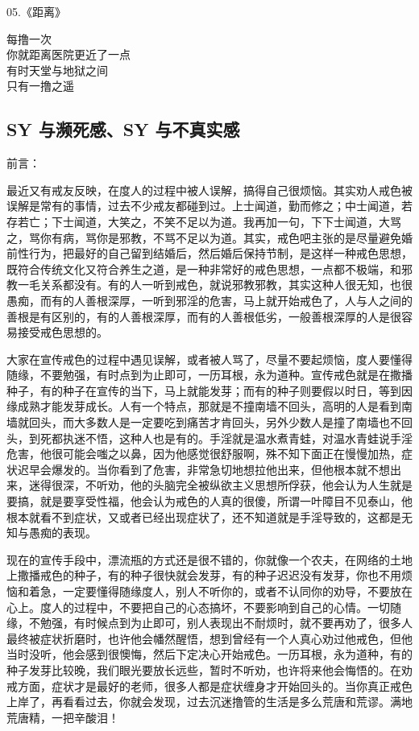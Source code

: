 \documentclass{ctexart}
\begin{document}
\begin{multicols}{2}
    \begin{center}
        05.《距离》\it

        每撸一次 \\ 你就距离医院更近了一点 \\ 有时天堂与地狱之间 \\ 只有一撸之遥
    \end{center}
\end{multicols}

\subsection{SY 与濒死感、SY 与不真实感}

前言：

最近又有戒友反映，在度人的过程中被人误解，搞得自己很烦恼。其实劝人戒色被误解是常有的事情，过去不少戒友都碰到过。上士闻道，勤而修之；中士闻道，若存若亡；下士闻道，大笑之，不笑不足以为道。我再加一句，下下士闻道，大骂之，骂你有病，骂你是邪教，不骂不足以为道。其实，戒色吧主张的是尽量避免婚前性行为，把最好的自己留到结婚后，然后婚后保持节制，是这样一种戒色思想，既符合传统文化又符合养生之道，是一种非常好的戒色思想，一点都不极端，和邪教一毛关系都没有。有的人一听到戒色，就说邪教邪教，其实这种人很无知，也很愚痴，而有的人善根深厚，一听到邪淫的危害，马上就开始戒色了，人与人之间的善根是有区别的，有的人善根深厚，而有的人善根低劣，一般善根深厚的人是很容易接受戒色思想的。

大家在宣传戒色的过程中遇见误解，或者被人骂了，尽量不要起烦恼，度人要懂得随缘，不要勉强，有时点到为止即可，一历耳根，永为道种。宣传戒色就是在撒播种子，有的种子在宣传的当下，马上就能发芽；而有的种子则要假以时日，等到因缘成熟才能发芽成长。人有一个特点，那就是不撞南墙不回头，高明的人是看到南墙就回头，而大多数人是一定要吃到痛苦才肯回头，另外少数人是撞了南墙也不回头，到死都执迷不悟，这种人也是有的。手淫就是温水煮青蛙，对温水青蛙说手淫危害，他很可能会嗤之以鼻，因为他感觉很舒服啊，殊不知下面正在慢慢加热，症状迟早会爆发的。当你看到了危害，非常急切地想拉他出来，但他根本就不想出来，迷得很深，不听劝，他的头脑完全被纵欲主义思想所俘获，他会认为人生就是要搞，就是要享受性福，他会认为戒色的人真的很傻，所谓一叶障目不见泰山，他根本就看不到症状，又或者已经出现症状了，还不知道就是手淫导致的，这都是无知与愚痴的表现。

现在的宣传手段中，漂流瓶的方式还是很不错的，你就像一个农夫，在网络的土地上撒播戒色的种子，有的种子很快就会发芽，有的种子迟迟没有发芽，你也不用烦恼和着急，一定要懂得随缘度人，别人不听你的，或者不认同你的劝导，不要放在心上。度人的过程中，不要把自己的心态搞坏，不要影响到自己的心情。一切随缘，不勉强，有时候点到为止即可，别人表现出不耐烦时，就不要再劝了，很多人最终被症状折磨时，也许他会幡然醒悟，想到曾经有一个人真心劝过他戒色，但他当时没听，他会感到很懊悔，然后下定决心开始戒色。一历耳根，永为道种，有的种子发芽比较晚，我们眼光要放长远些，暂时不听劝，也许将来他会悔悟的。在劝戒方面，症状才是最好的老师，很多人都是症状缠身才开始回头的。当你真正戒色上岸了，再看看过去，你就会发现，过去沉迷撸管的生活是多么荒唐和荒谬。满地荒唐精，一把辛酸泪！
\end{document}
